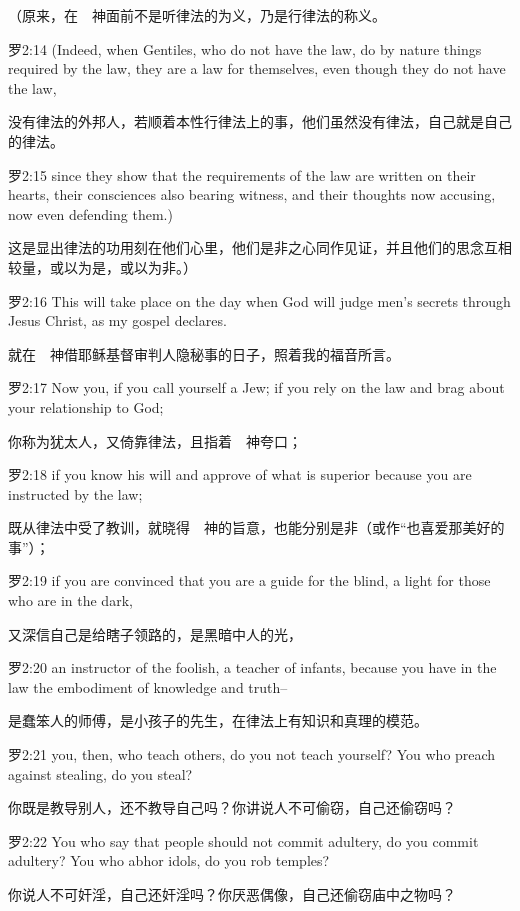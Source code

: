 \documentclass[a4paper,11pt,onecolumn,twoside]{ctexart}
\begin{document}
\begin{multicols}{2}
 （原来，在　神面前不是听律法的为义，乃是行律法的称义。


 罗2:14
 (Indeed, when Gentiles, who do not have the law, do by nature things required by the law, they are a law for themselves, even though they do not have the law,

 没有律法的外邦人，若顺着本性行律法上的事，他们虽然没有律法，自己就是自己的律法。


 罗2:15
 since they show that the requirements of the law are written on their hearts, their consciences also bearing witness, and their thoughts now accusing, now even defending them.)

 这是显出律法的功用刻在他们心里，他们是非之心同作见证，并且他们的思念互相较量，或以为是，或以为非。）


 罗2:16
 This will take place on the day when God will judge men's secrets through Jesus Christ, as my gospel declares.

 就在　神借耶稣基督审判人隐秘事的日子，照着我的福音所言。


 罗2:17
 Now you, if you call yourself a Jew; if you rely on the law and brag about your relationship to God;

 你称为犹太人，又倚靠律法，且指着　神夸口；


 罗2:18
 if you know his will and approve of what is superior because you are instructed by the law;

 既从律法中受了教训，就晓得　神的旨意，也能分别是非（或作“也喜爱那美好的事”）；


 罗2:19
 if you are convinced that you are a guide for the blind, a light for those who are in the dark,

 又深信自己是给瞎子领路的，是黑暗中人的光，


 罗2:20
 an instructor of the foolish, a teacher of infants, because you have in the law the embodiment of knowledge and truth--

 是蠢笨人的师傅，是小孩子的先生，在律法上有知识和真理的模范。


 罗2:21
 you, then, who teach others, do you not teach yourself? You who preach against stealing, do you steal?

 你既是教导别人，还不教导自己吗？你讲说人不可偷窃，自己还偷窃吗？


 罗2:22
 You who say that people should not commit adultery, do you commit adultery? You who abhor idols, do you rob temples?

 你说人不可奸淫，自己还奸淫吗？你厌恶偶像，自己还偷窃庙中之物吗？



\end{multicols}
\end{document}
